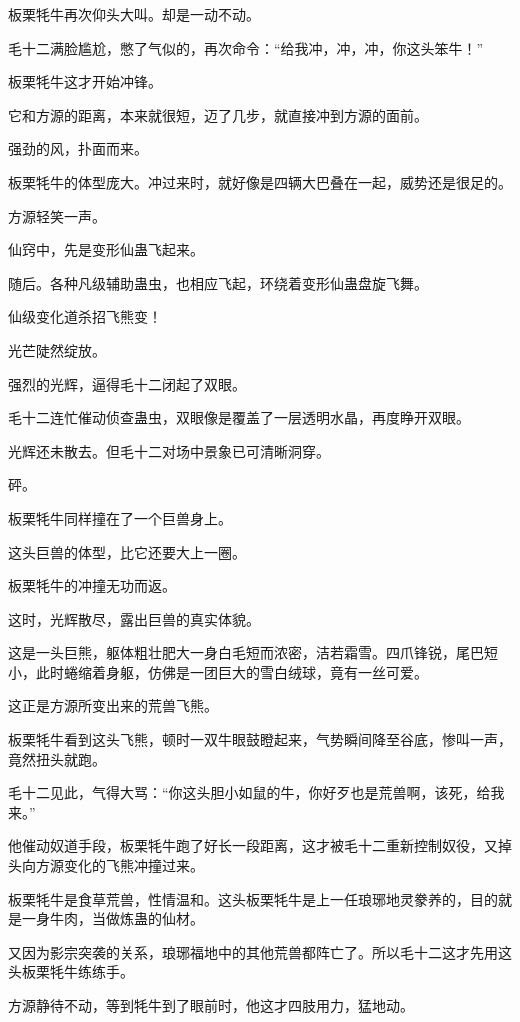 \begin{this_body}
板栗牦牛再次仰头大叫。却是一动不动。

毛十二满脸尴尬，憋了气似的，再次命令：“给我冲，冲，冲，你这头笨牛！”

板栗牦牛这才开始冲锋。

它和方源的距离，本来就很短，迈了几步，就直接冲到方源的面前。

强劲的风，扑面而来。

板栗牦牛的体型庞大。冲过来时，就好像是四辆大巴叠在一起，威势还是很足的。

方源轻笑一声。

仙窍中，先是变形仙蛊飞起来。

随后。各种凡级辅助蛊虫，也相应飞起，环绕着变形仙蛊盘旋飞舞。

仙级变化道杀招飞熊变！

光芒陡然绽放。

强烈的光辉，逼得毛十二闭起了双眼。

毛十二连忙催动侦查蛊虫，双眼像是覆盖了一层透明水晶，再度睁开双眼。

光辉还未散去。但毛十二对场中景象已可清晰洞穿。

砰。

板栗牦牛同样撞在了一个巨兽身上。

这头巨兽的体型，比它还要大上一圈。

板栗牦牛的冲撞无功而返。

这时，光辉散尽，露出巨兽的真实体貌。

这是一头巨熊，躯体粗壮肥大一身白毛短而浓密，洁若霜雪。四爪锋锐，尾巴短小，此时蜷缩着身躯，仿佛是一团巨大的雪白绒球，竟有一丝可爱。

这正是方源所变出来的荒兽飞熊。

板栗牦牛看到这头飞熊，顿时一双牛眼鼓瞪起来，气势瞬间降至谷底，惨叫一声，竟然扭头就跑。

毛十二见此，气得大骂：“你这头胆小如鼠的牛，你好歹也是荒兽啊，该死，给我来。”

他催动奴道手段，板栗牦牛跑了好长一段距离，这才被毛十二重新控制奴役，又掉头向方源变化的飞熊冲撞过来。

板栗牦牛是食草荒兽，性情温和。这头板栗牦牛是上一任琅琊地灵豢养的，目的就是一身牛肉，当做炼蛊的仙材。

又因为影宗突袭的关系，琅琊福地中的其他荒兽都阵亡了。所以毛十二这才先用这头板栗牦牛练练手。

方源静待不动，等到牦牛到了眼前时，他这才四肢用力，猛地动。


\end{this_body}
